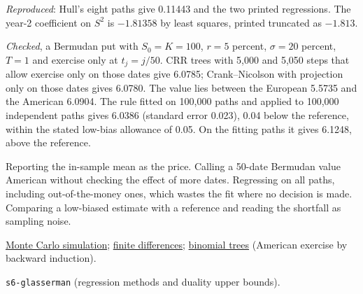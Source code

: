 \begin{qfmethod}
 \emph{Reproduced}: Hull's eight paths give 0.11443 and the two printed regressions. The year-2 coefficient on $S^2$ is $-1.81358$ by least squares, printed truncated as $-1.813$.

\emph{Checked}, a Bermudan put with $S_0=K=100$, $r=5$ percent, $\sigma=20$ percent, $T=1$ and exercise only at $t_j=j/50$. CRR trees with 5{,}000 and 5{,}050 steps that allow exercise only on those dates give 6.0785; Crank--Nicolson with projection only on those dates gives 6.0780. The value lies between the European 5.5735 and the American 6.0904. The rule fitted on 100{,}000 paths and applied to 100{,}000 independent paths gives 6.0386 (standard error 0.023), 0.04 below the reference, within the stated low-bias allowance of 0.05. On the fitting paths it gives 6.1248, above the reference.

 Reporting the in-sample mean as the price. Calling a 50-date Bermudan value American without checking the effect of more dates. Regressing on all paths, including out-of-the-money ones, which wastes the fit where no decision is made. Comparing a low-biased estimate with a reference and reading the shortfall as sampling noise.

 \hyperref[meth:monte-carlo-simulation]{Monte Carlo simulation}; \hyperref[meth:finite-difference-option-pricing]{finite differences}; \hyperref[meth:multi-period-binomial-valuation]{binomial trees} (American exercise by backward induction).

 \nolinkurl{s6-glasserman} (regression methods and duality upper bounds).

\end{qfmethod}

